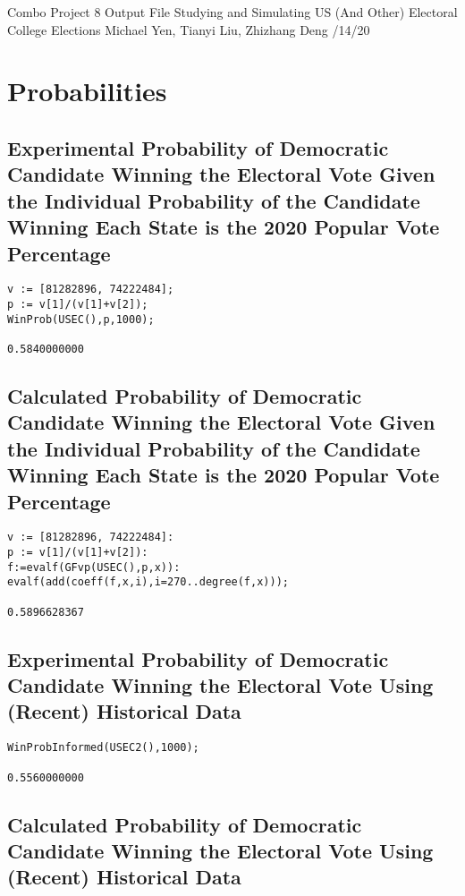 \documentclass[12pt]{article}
\begin{document}
\noindent
Combo Project 8 Output File \newline
Studying and Simulating US (And Other) Electoral College Elections \newline
Michael Yen, Tianyi Liu, Zhizhang Deng /14/20

\section{Probabilities}
\subsection{Experimental Probability of Democratic Candidate Winning the Electoral Vote Given the Individual Probability of the Candidate Winning Each State is the 2020 Popular Vote Percentage}

\begin{verbatim}
v := [81282896, 74222484];
p := v[1]/(v[1]+v[2]);
WinProb(USEC(),p,1000);

0.5840000000
\end{verbatim}

\subsection{Calculated Probability of Democratic Candidate Winning the Electoral Vote Given the Individual Probability of the Candidate Winning Each State is the 2020 Popular Vote Percentage}

\begin{verbatim}
v := [81282896, 74222484]:
p := v[1]/(v[1]+v[2]):
f:=evalf(GFvp(USEC(),p,x)):
evalf(add(coeff(f,x,i),i=270..degree(f,x)));

0.5896628367
\end{verbatim}

\subsection{Experimental Probability of Democratic Candidate Winning the Electoral Vote Using (Recent) Historical Data}

\begin{verbatim}
WinProbInformed(USEC2(),1000);

0.5560000000
\end{verbatim}

\subsection{Calculated Probability of Democratic Candidate Winning the Electoral Vote Using (Recent) Historical Data}
\end{document}
